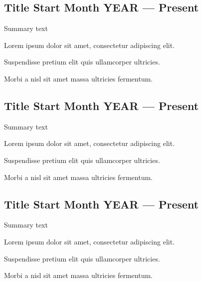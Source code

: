 \documentclass[a4paper,12pt]{article}
\begin{document}


\subsection{{Title \hfill Start Month YEAR --- Present}}
\vspace*{3pt}
Summary text
\begin{zitemize}
\item Lorem ipsum dolor sit amet, consectetur adipiscing elit.
\item Suspendisse pretium elit quis ullamcorper ultricies.
\item Morbi a nisl sit amet massa ultricies fermentum.
\end{zitemize}


\subsection{{Title \hfill Start Month YEAR --- Present}}
\vspace*{3pt}
Summary text
\begin{zitemize}
\item Lorem ipsum dolor sit amet, consectetur adipiscing elit.
\item Suspendisse pretium elit quis ullamcorper ultricies.
\item Morbi a nisl sit amet massa ultricies fermentum.
\end{zitemize}



\subsection{{Title \hfill Start Month YEAR --- Present}}
Summary text
\vspace*{3pt}
\begin{zitemize}
\item Lorem ipsum dolor sit amet, consectetur adipiscing elit.
\item Suspendisse pretium elit quis ullamcorper ultricies.
\item Morbi a nisl sit amet massa ultricies fermentum.
\end{zitemize}
\end{document}
